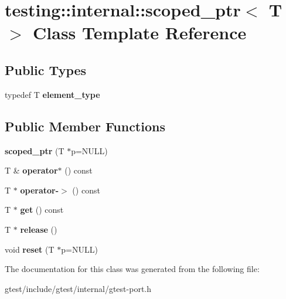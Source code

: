 \hypertarget{classtesting_1_1internal_1_1scoped__ptr}{}\section{testing\+:\+:internal\+:\+:scoped\+\_\+ptr$<$ T $>$ Class Template Reference}
\label{classtesting_1_1internal_1_1scoped__ptr}
\subsection*{Public Types}
\begin{DoxyCompactItemize}
\item 
\mbox{\label{classtesting_1_1internal_1_1scoped__ptr_ae755ffeebada8e20b68c1d1ffa91cf13}} 
typedef T {\bfseries element\+\_\+type}
\end{DoxyCompactItemize}
\subsection*{Public Member Functions}
\begin{DoxyCompactItemize}
\item 
\mbox{\label{classtesting_1_1internal_1_1scoped__ptr_adb972432999a0c63720df148964ac2a5}} 
{\bfseries scoped\+\_\+ptr} (T $\ast$p=N\+U\+LL)
\item 
\mbox{\label{classtesting_1_1internal_1_1scoped__ptr_a0aba95f68eceb6422a0b50b6f92047c2}} 
T \& {\bfseries operator$\ast$} () const
\item 
\mbox{\label{classtesting_1_1internal_1_1scoped__ptr_a2b465830a322e2c3ea420e5ccf0472f4}} 
T $\ast$ {\bfseries operator-\/$>$} () const
\item 
\mbox{\label{classtesting_1_1internal_1_1scoped__ptr_aa5984291e12453f1e81b7676d1fa26fd}} 
T $\ast$ {\bfseries get} () const
\item 
\mbox{\label{classtesting_1_1internal_1_1scoped__ptr_a7a4f3e568d81a5d8bcb5f8d6bf5130b1}} 
T $\ast$ {\bfseries release} ()
\item 
\mbox{\label{classtesting_1_1internal_1_1scoped__ptr_acac03266a43359801aff0de5c990bec0}} 
void {\bfseries reset} (T $\ast$p=N\+U\+LL)
\end{DoxyCompactItemize}


The documentation for this class was generated from the following file\+:\begin{DoxyCompactItemize}
\item 
gtest/include/gtest/internal/gtest-\/port.\+h\end{DoxyCompactItemize}
